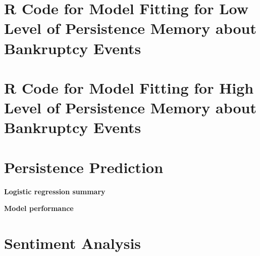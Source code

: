 \documentclass[9pt,twoside,lineno]{pnas-new}
\begin{document}
\section*{R Code for Model Fitting for Low Level of Persistence Memory about Bankruptcy Events}


\section*{R Code for Model Fitting for High Level of Persistence Memory about Bankruptcy Events}


\section*{Persistence Prediction}
\textbf{Logistic regression summary}


\textbf{Model performance}




\section*{Sentiment Analysis}
\end{document}
